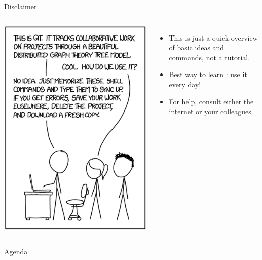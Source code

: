 \begin{frame}{Disclaimer}
\begin{columns}
\includegraphics[width=\columnwidth]{images/xkcd_git.png}
\begin{itemize}
\item This is just a quick overview of basic ideas and commands, not a tutorial.
\item Best way to learn : use it every day!
\item For help, consult either the internet or your colleagues.
\end{itemize}
\end{columns}
\end{frame}

\begin{frame}{Agenda}
\tableofcontents
\end{frame}

